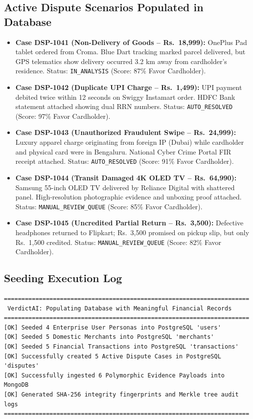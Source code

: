 \documentclass[11pt,a4paper]{article}
\begin{document}
\subsection{Active Dispute Scenarios Populated in Database}
\begin{itemize}
    \item \textbf{Case DSP-1041 (Non-Delivery of Goods -- Rs.\ 18,999):} OnePlus Pad tablet ordered from Croma. Blue Dart tracking marked parcel delivered, but GPS telematics show delivery occurred 3.2 km away from cardholder's residence. Status: \texttt{IN\_ANALYSIS} (Score: 87\% Favor Cardholder).
    \item \textbf{Case DSP-1042 (Duplicate UPI Charge -- Rs.\ 1,499):} UPI payment debited twice within 12 seconds on Swiggy Instamart order. HDFC Bank statement attached showing dual RRN numbers. Status: \texttt{AUTO\_RESOLVED} (Score: 97\% Favor Cardholder).
    \item \textbf{Case DSP-1043 (Unauthorized Fraudulent Swipe -- Rs.\ 24,999):} Luxury apparel charge originating from foreign IP (Dubai) while cardholder and physical card were in Bengaluru. National Cyber Crime Portal FIR receipt attached. Status: \texttt{AUTO\_RESOLVED} (Score: 91\% Favor Cardholder).
    \item \textbf{Case DSP-1044 (Transit Damaged 4K OLED TV -- Rs.\ 64,990):} Samsung 55-inch OLED TV delivered by Reliance Digital with shattered panel. High-resolution photographic evidence and unboxing proof attached. Status: \texttt{MANUAL\_REVIEW\_QUEUE} (Score: 85\% Favor Cardholder).
    \item \textbf{Case DSP-1045 (Uncredited Partial Return -- Rs.\ 3,500):} Defective headphones returned to Flipkart; Rs.\ 3,500 promised on pickup slip, but only Rs.\ 1,500 credited. Status: \texttt{MANUAL\_REVIEW\_QUEUE} (Score: 82\% Favor Cardholder).
\end{itemize}

\subsection{Seeding Execution Log}
\begin{verbatim}
======================================================================
 VerdictAI: Populating Database with Meaningful Financial Records
======================================================================
[OK] Seeded 4 Enterprise User Personas into PostgreSQL 'users'
[OK] Seeded 5 Domestic Merchants into PostgreSQL 'merchants'
[OK] Seeded 5 Financial Transactions into PostgreSQL 'transactions'
[OK] Successfully created 5 Active Dispute Cases in PostgreSQL 'disputes'
[OK] Successfully ingested 6 Polymorphic Evidence Payloads into MongoDB
[OK] Generated SHA-256 integrity fingerprints and Merkle tree audit logs
======================================================================
\end{verbatim}
\end{document}
